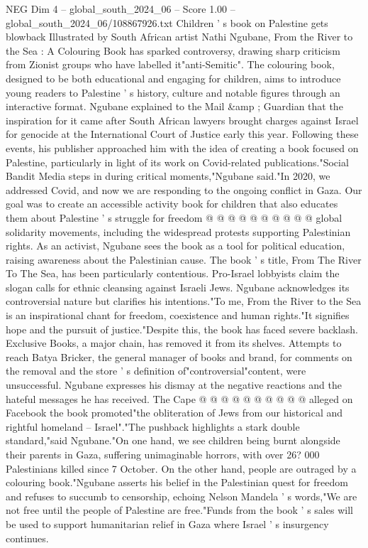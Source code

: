\begin{textsample}{NEG Dim 4 – global\_south\_2024\_06 – Score 1.00 – global\_south\_2024\_06/108867926.txt}  \label{ex:f4_neg_377}
Children ' s book on Palestine gets blowback Illustrated by South African artist Nathi Ngubane, From the River to the Sea : A Colouring Book has sparked controversy, drawing sharp criticism from Zionist groups who have labelled it"anti-Semitic".
The colouring book, designed to be both educational and engaging for children, aims to introduce young readers to Palestine ' s history, culture and notable figures through an interactive format.
Ngubane explained to the Mail \&amp ; Guardian that the inspiration for it came after South African lawyers brought charges against Israel for genocide at the International Court of Justice early this year.
Following these events, his publisher approached him with the idea of creating a book focused on Palestine, particularly in light of its work on Covid-related publications."Social Bandit Media steps in during critical moments,"Ngubane said."In 2020, we addressed Covid, and now we are responding to the ongoing conflict in Gaza.
Our goal was to create an accessible activity book for children that also educates them about Palestine ' s struggle for freedom @ @ @ @ @ @ @ @ @ @ global solidarity movements, including the widespread protests supporting Palestinian rights.
As an activist, Ngubane sees the book as a tool for political education, raising awareness about the Palestinian cause.
The book ' s title, From The River To The Sea, has been particularly contentious.
Pro-Israel lobbyists claim the slogan calls for ethnic cleansing against Israeli Jews.
Ngubane acknowledges its controversial nature but clarifies his intentions."To me, From the River to the Sea is an inspirational chant for freedom, coexistence and human rights."It signifies hope and the pursuit of justice."Despite this, the book has faced severe backlash.
Exclusive Books, a major chain, has removed it from its shelves.
Attempts to reach Batya Bricker, the general manager of books and brand, for comments on the removal and the store ' s definition of"controversial"content, were unsuccessful.
Ngubane expresses his dismay at the negative reactions and the hateful messages he has received.
The Cape @ @ @ @ @ @ @ @ @ @ alleged on Facebook the book promoted"the obliteration of Jews from our historical and rightful homeland -- Israel"."The pushback highlights a stark double standard,"said Ngubane."On one hand, we see children being burnt alongside their parents in Gaza, suffering unimaginable horrors, with over 26? 000 Palestinians killed since 7 October.
On the other hand, people are outraged by a colouring book."Ngubane asserts his belief in the Palestinian quest for freedom and refuses to succumb to censorship, echoing Nelson Mandela ' s words,"We are not free until the people of Palestine are free."Funds from the book ' s sales will be used to support humanitarian relief in Gaza where Israel ' s insurgency continues.

\end{textsample}
